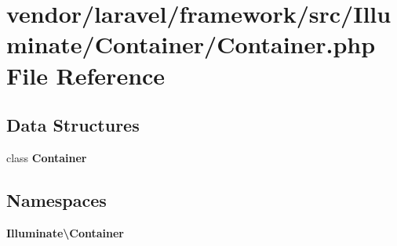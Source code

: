 \section{vendor/laravel/framework/src/\+Illuminate/\+Container/\+Container.php File Reference}
\label{_container_2_container_8php}
\subsection*{Data Structures}
\begin{DoxyCompactItemize}
\item 
class {\bf Container}
\end{DoxyCompactItemize}
\subsection*{Namespaces}
\begin{DoxyCompactItemize}
\item 
 {\bf Illuminate\textbackslash{}\+Container}
\end{DoxyCompactItemize}
